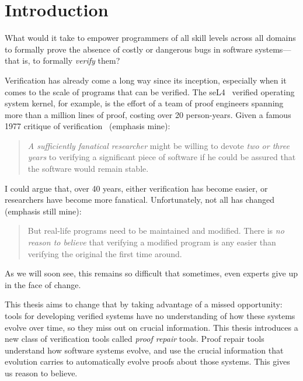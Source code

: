 \chapter{Introduction}


What would it take to empower programmers of all skill levels across all domains to formally prove
the absence of costly or dangerous bugs in software systems---that is, to formally \textit{verify} them?

Verification has already come a long way since its inception,
especially when it comes to the scale of programs that can be verified.
The seL4~\cite{Klein2009} verified operating system kernel, for example,
is the effort of a team of proof engineers spanning more than
a million lines of proof, costing over 20 person-years.
Given a famous 1977 critique of verification~\cite{DeMillo1977} (emphasis mine):

\begin{quote}
\textit{A sufficiently fanatical researcher}
might be willing to devote \textit{two or 
three years} to verifying a significant 
piece of software if he could be 
assured that the software would remain stable.
\end{quote}
I could argue that, over 40 years, either verification has become easier,
or researchers have become more fanatical. Unfortunately, not all has changed (emphasis still mine):

\begin{quote}
But real-life programs need to 
be maintained and modified. 
There is \textit{no reason to believe} that verifying a modified program is any 
easier than verifying the original the 
first time around.
\end{quote}
As we will soon see, this remains so difficult that sometimes, even experts give up in the face of change. %

This thesis aims to change that by taking advantage of a missed opportunity: tools for developing verified systems
have no understanding of how these systems evolve over time, so they miss out on crucial information.
This thesis introduces a new class of verification tools called \textit{proof repair} tools.
Proof repair tools understand how software systems evolve, and use the crucial information that evolution carries
to automatically evolve proofs about those systems.
This gives us reason to believe.

